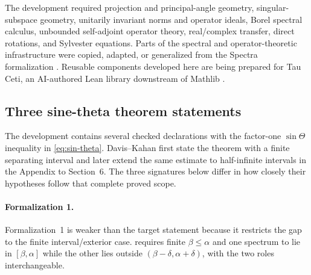 \documentclass{article}
\begin{document}
The development required projection and principal-angle geometry,
singular-subspace geometry, unitarily invariant norms and operator ideals,
Borel spectral calculus, unbounded self-adjoint operator theory, real/complex
transfer, direct rotations, and Sylvester equations.  Parts of the spectral and
operator-theoretic infrastructure were copied, adapted, or generalized from the
Spectra formalization \citep{bornemann2026spectra}.  Reusable components developed
here are being prepared for Tau Ceti, an AI-authored Lean library downstream of
Mathlib \citep{tauceti2026}.

\subsection{Three sine-theta theorem statements}
\label{sec:scope-mismatch}

The development contains several checked declarations with the factor-one
$\sin\Theta$ inequality in \cref{eq:sin-theta}.  Davis--Kahan first state the
theorem with a finite separating interval and later extend the same estimate to
half-infinite intervals in the Appendix to Section~6.  The three signatures
below differ in how closely their hypotheses follow that complete proved scope.

\paragraph{Formalization 1.}
Formalization~1 is weaker than the target statement because it restricts the
gap to the finite interval/exterior case.  
requires finite $\beta\le\alpha$ and one spectrum to lie in $[\beta,\alpha]$
while the other lies outside $(\beta-\delta,\alpha+\delta)$, with the two roles
interchangeable.
\end{document}
